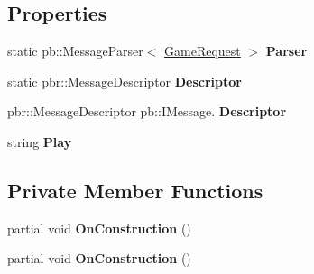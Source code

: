 \subsection*{Properties}
\begin{DoxyCompactItemize}
\item 
\mbox{\label{class_jcoinche_1_1_google_1_1_protobuf_1_1_game_request_a35662c4c966e05f35b5d74356b77ff95}} 
static pb\+::\+Message\+Parser$<$ \hyperlink{class_jcoinche_1_1_google_1_1_protobuf_1_1_game_request}{Game\+Request} $>$ {\bfseries Parser}
\item 
\mbox{\label{class_jcoinche_1_1_google_1_1_protobuf_1_1_game_request_a756fdf11135b4a16aa333b63ccb2a5dc}} 
static pbr\+::\+Message\+Descriptor {\bfseries Descriptor}
\item 
\mbox{\label{class_jcoinche_1_1_google_1_1_protobuf_1_1_game_request_a9ee81ae84906a04559f4e93afd0ad1a1}} 
pbr\+::\+Message\+Descriptor pb\+::\+I\+Message. {\bfseries Descriptor}
\item 
\mbox{\label{class_jcoinche_1_1_google_1_1_protobuf_1_1_game_request_ab166b49b61376bae92056b6d83a2c81a}} 
string {\bfseries Play}
\end{DoxyCompactItemize}
\subsection*{Private Member Functions}
\begin{DoxyCompactItemize}
\item 
\mbox{\label{class_jcoinche_1_1_google_1_1_protobuf_1_1_game_request_a6f0cf6bbec580629293cceafcfaeb5de}} 
partial void {\bfseries On\+Construction} ()
\item 
\mbox{\label{class_jcoinche_1_1_google_1_1_protobuf_1_1_game_request_a6f0cf6bbec580629293cceafcfaeb5de}} 
partial void {\bfseries On\+Construction} ()
\end{DoxyCompactItemize}
